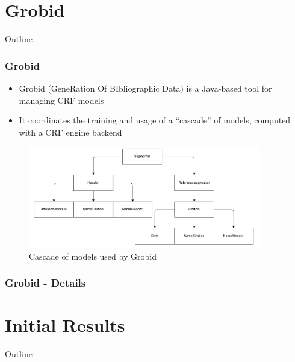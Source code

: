 \documentclass{beamer}
\begin{document}

\section{Grobid}
\begin{frame}[noframenumbering]{Outline}
\tableofcontents[currentsection]
\end{frame}


\begin{frame}
\frametitle{Grobid}
\begin{itemize}
\item Grobid (GeneRation Of BIbliographic Data) is a Java-based tool for managing CRF models 
\item It coordinates the training and usage of a ``cascade'' of models, computed with a CRF engine backend
\end{itemize}
\begin{figure}[!ht]
\center
\includegraphics[width=4in]{figures/cascade.pdf}
\caption{Cascade of models used by Grobid}
\label{fig:cascade}
\end{figure}
\end{frame}


\begin{frame}
\frametitle{Grobid - Details}
\end{frame}


\section{Initial Results}
\begin{frame}[noframenumbering]{Outline}
\tableofcontents[currentsection]
\end{frame}

\end{document}
